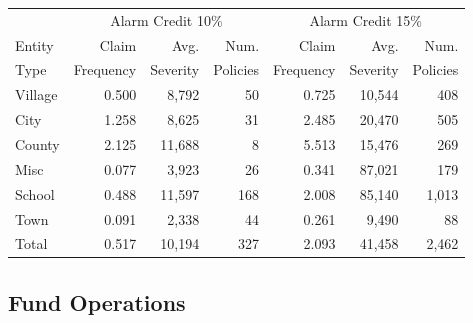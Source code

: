 \documentclass[serif,10pt]{beamer}
\begin{document}
\begin{frame}
\begin{table}[htbp]
    \begin{tabular}{l | rrr | rrr }
    \hline
   & \multicolumn{3}{c|}{Alarm Credit 10\%} & \multicolumn{3}{c}{Alarm Credit 15\%}  \\
    Entity & Claim & Avg.  & Num. & Claim & Avg.  & Num. \\
    Type  & Frequency & Severity & Policies  & Frequency & Severity  &  Policies\\
    \hline
    Village &            0.500  &            8,792  &                 50  &            0.725  &         10,544  &               408  \\
    City  &            1.258  &            8,625  &                 31  &            2.485  &         20,470  &               505  \\
    County &            2.125  &         11,688  &                   8  &            5.513  &         15,476  &               269  \\
    Misc  &            0.077  &            3,923  &                 26  &            0.341  &         87,021  &               179  \\
    School &            0.488  &         11,597  &               168  &            2.008  &         85,140  &            1,013  \\
    Town  &            0.091  &            2,338  &                 44  &            0.261  &            9,490  &                 88  \\
    \hline
    Total &            0.517  &         10,194  &               327  &            2.093  &         41,458  &            2,462  \\
    \hline \hline
    \end{tabular}
\end{table}
\end{frame}

\subsection{Fund Operations}
\end{document}

